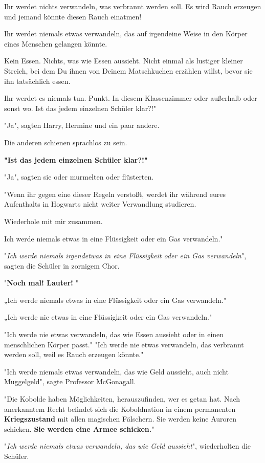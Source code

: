{Ihr werdet nichts verwandeln, was verbrannt werden soll. Es wird Rauch erzeugen und jemand könnte diesen Rauch einatmen!

Ihr werdet niemals etwas verwandeln, das auf irgendeine Weise in den Körper eines Menschen gelangen könnte.

Kein Essen. Nichts, was wie Essen aussieht. Nicht einmal als lustiger kleiner Streich, bei dem Du ihnen von Deinem Matschkuchen erzählen willst, bevor sie ihn tatsächlich essen.

Ihr werdet es niemals tun. Punkt. In diesem Klassenzimmer oder außerhalb oder sonst wo. Ist das jedem einzelnen Schüler klar?!"

"Ja", sagten Harry, Hermine und ein paar andere.

Die anderen schienen sprachlos zu sein.

\textbf{"Ist das jedem einzelnen Schüler klar?!"}

"Ja", sagten sie oder murmelten oder flüsterten.

"Wenn ihr gegen eine dieser Regeln verstoßt, werdet ihr während eures Aufenthalts in Hogwarts nicht weiter Verwandlung studieren.

Wiederhole mit mir zusammen.

Ich werde niemals etwas in eine Flüssigkeit oder ein Gas verwandeln."

"\emph{Ich werde niemals irgendetwas in eine Flüssigkeit oder ein Gas verwandeln}", sagten die Schüler in zornigem Chor.

"\textbf{Noch mal! Lauter!} "

„Ich werde niemals etwas in eine Flüssigkeit oder ein Gas verwandeln."

„Ich werde nie etwas in eine Flüssigkeit oder ein Gas verwandeln."

"Ich werde nie etwas verwandeln, das wie Essen aussieht oder in einen menschlichen Körper passt." "Ich werde nie etwas verwandeln, das verbrannt werden soll, weil es Rauch erzeugen könnte."

"Ich werde niemals etwas verwandeln, das wie Geld aussieht, auch nicht Muggelgeld", sagte Professor McGonagall.

"Die Kobolde haben Möglichkeiten, herauszufinden, wer es getan hat. Nach anerkanntem Recht befindet sich die Koboldnation in einem permanenten \textbf{Kriegszustand} mit allen magischen Fälschern. Sie werden keine Auroren schicken. \textbf{Sie werden eine Armee schicken.}"

"\emph{Ich werde niemals etwas verwandeln, das wie Geld aussieht}", wiederholten die Schüler.

}

